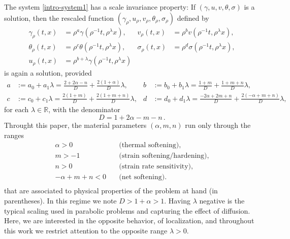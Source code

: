 \documentclass[a4paper,11pt]{article}
\theoremstyle{remark}
\begin{document}
The system \eqref{intro-system1} has a scale invariance property: If $(\gamma,u,v,\theta,\sigma)$ is a solution, then the rescaled function 
$(\gamma_\rho,u_\rho,v_\rho,\theta_\rho,\sigma_\rho)$ defined by
\begin{equation}\label{eq:scale}
\begin{aligned}
 \gamma_\rho(t,x) &= \rho^a\gamma(\rho^{-1}t,\rho^\lambda x), &
 v_\rho(t,x) &= \rho^bv(\rho^{-1}t,\rho^\lambda x),\\
 \theta_\rho(t,x) &= \rho^c\theta(\rho^{-1}t,\rho^\lambda x), &
 \sigma_\rho(t,x) &= \rho^d\sigma(\rho^{-1}t,\rho^\lambda x),\\
 u_\rho(t,x) &= \rho^{b+\lambda}\gamma(\rho^{-1}t,\rho^\lambda x)
\end{aligned}
\end{equation}
is again a solution, provided
\begin{equation} \label{eq:exponents}
\begin{aligned}
 a&:= a_0 + a_1 \lambda=\frac{2+2\alpha-n}{D} + \frac{2(1 + \alpha)}{D}\lambda, & b&:=b_0 + b_1\lambda=\frac{1+m}{D} + \frac{1+m+n}{D}\lambda ,\\
 c&:=c_0 + c_1\lambda=\frac{2(1+m)}{D} + \frac{2(1+m+n)}{D}\lambda, & d&:=d_0 + d_1\lambda=\frac{-2\alpha + 2m +n}{D} + \frac{2(-\alpha+m+n)}{D}\lambda,
\end{aligned}
\end{equation}
for each $\lambda \in \mathbb{R}$, with the denominator 
\begin{equation}
\label{defD}
D = 1+2\alpha-m-n \, .
\end{equation}
Throught this paper, the material parameters $(\alpha,m,n)$ run only through the ranges
\begin{equation}
 \begin{aligned}
  \alpha>0\quad&\text{(thermal softening)},\\
  m>-1 \quad&\text{(strain softening/hardening)}, \\%
  n>0 \quad&\text{(strain rate sensitivity)},\\ %
  -\alpha+m+n<0 \quad&\text{(net softening)}. \\%
\end{aligned}\label{eq:paramrange}
\end{equation}
that are associated to physical properties of the problem at hand (in parentheses).
In this regime we note $D>1+\alpha>1$. Having $\lambda$ negative is the typical scaling used in parabolic problems and capturing the effect
of diffusion.
Here, we are interested in the opposite behavior, of localization, and throughout this work we restrict attention to the opposite range $\lambda>0$. 
\end{document}
